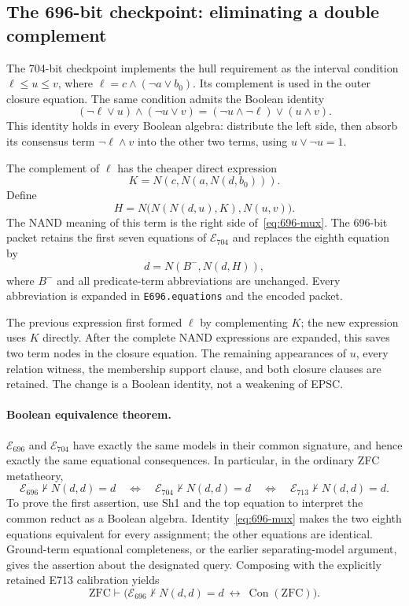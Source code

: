 \subsection{The 696-bit checkpoint: eliminating a double complement}
\label{sec:eq696}

The 704-bit checkpoint implements the hull requirement as the interval
condition $\ell\leq u\leq v$, where
$\ell=c\wedge(\neg a\lor b_0)$.  Its complement is used in the
outer closure equation.  The same condition admits the Boolean
identity
\begin{equation}
 (\neg\ell\lor u)\wedge(\neg u\lor v)
   =(\neg u\wedge\neg\ell)\lor(u\wedge v).
 \label{eq:696-mux}
\end{equation}
This identity holds in every Boolean algebra: distribute the left
side, then absorb its consensus term $\neg\ell\wedge v$ into the
other two terms, using $u\lor\neg u=1$.

The complement of $\ell$ has the cheaper direct expression
\[
                 K=N(c,N(a,N(d,b_0))).
\]
Define
\begin{equation}
 H=N\bigl(N(N(d,u),K),N(u,v)\bigr).
 \label{eq:696-hull}
\end{equation}
The NAND meaning of this term is the right side
of~\eqref{eq:696-mux}.  The 696-bit packet retains the first seven
equations of $\mathcal E_{704}$ and replaces the eighth equation by
\begin{equation}
                        d=N(B^-,N(d,H)),
 \label{eq:696-closure}
\end{equation}
where $B^-$ and all predicate-term abbreviations are unchanged.
Every abbreviation is expanded in \texttt{E696.equations} and the
encoded packet.

The previous expression first formed $\ell$ by complementing $K$;
the new expression uses $K$ directly.  After the complete NAND
expressions are expanded, this saves two term nodes in the closure
equation.  The remaining appearances of $u$, every relation witness,
the membership support clause, and both closure clauses are retained.
The change is a Boolean identity, not a weakening of EPSC.

\paragraph{Boolean equivalence theorem.}
$\mathcal E_{696}$ and $\mathcal E_{704}$ have exactly the same
models in their common signature, and hence exactly the same
equational consequences.  In particular, in the ordinary ZFC
metatheory,
\[
 \mathcal E_{696}\nvdash N(d,d)=d
 \quad\Longleftrightarrow\quad
 \mathcal E_{704}\nvdash N(d,d)=d
 \quad\Longleftrightarrow\quad
 \mathcal E_{713}\nvdash N(d,d)=d.
\]
To prove the first assertion, use Sh1 and the top equation to interpret
the common reduct as a Boolean algebra.  Identity~\eqref{eq:696-mux}
makes the two eighth equations equivalent for every assignment;
the other equations are identical.  Ground-term equational
completeness, or the earlier separating-model argument, gives the
assertion about the designated query.  Composing with the explicitly
retained E713 calibration yields
\[
 \mathrm{ZFC}\vdash
 \bigl(\mathcal E_{696}\nvdash N(d,d)=d
          \ \longleftrightarrow\ \operatorname{Con}(\mathrm{ZFC})\bigr).
\]

